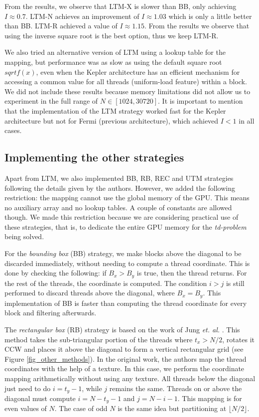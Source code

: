 \documentclass[conference]{IEEEtran}
\begin{document}
From the results, we observe that LTM-X is slower than BB, only achieving $I \approx 0.7$. LTM-N achieves an improvement of $I \approx 1.03$ which is only a little better than BB.
LTM-R achieved a value of $I\approx1.15$. From the results we observe that using the inverse square root is the best option, thus we keep LTM-R.

We also tried an alternative version of LTM using a lookup table for the mapping, but performance was as slow as using 
the default square root $sqrtf(x)$, even when the Kepler architecture has an efficient mechanism for accessing a common value 
for all threads (uniform-load feature) within a block. We did not include these results because memory limitations did not allow us to 
experiment in the full range of $N \in [1024, 30720]$. It is important to mention that the implementation of the LTM strategy worked fast for 
the Kepler architecture but not for Fermi (previous architecture), which achieved $I < 1$ in all cases. 
\subsection{Implementing the other strategies}
Apart from LTM, we also implemented BB, RB, REC and UTM strategies following the details given by the authors. However, we added the following restriction: 
the mapping cannot use the global memory of the GPU. This means no auxiliary array and no lookup tables. A couple of constants are allowed though. 
We made this restriction because we are considering practical use of these strategies, that is, to dedicate the entire GPU memory for the \textit{td-problem} being solved.

For the \textit{bounding box} (BB) strategy, we make blocks above the diagonal to be discarded immediately, without needing to compute a thread coordinate. This is done by checking the following: 
if $B_x > B_y$ is true, then the thread returns. For the rest of the threads, the coordinate is computed. The condition $i > j$ is still performed to discard threads above the diagonal, where $B_x = B_y$. 
This implementation of BB is faster than computing the thread coordinate for every block and filtering afterwards.

The \textit{rectangular box} (RB) strategy is based on the work of Jung \textit{et. al.} \cite{Jung2008}. This method takes the sub-triangular portion of the threads where $t_x > N/2$, rotates it CCW and 
places it above the diagonal to form a vertical rectangular grid (see Figure \ref{fig_other_methods}). In the original work, the authors map the thread coordinates with the help of a texture. In this case, 
we perform the coordinate mapping arithmetically without using any texture. All threads below the diagonal just need to do $i = t_y-1$, while $j$ remains the same. 
Threads on or above the diagonal must compute $i = N - t_y - 1$ and $j = N - i - 1$. This mapping is for even values of $N$. The case of odd $N$ is the same idea but partitioning at $\lfloor N/2 \rfloor$.
\end{document}
